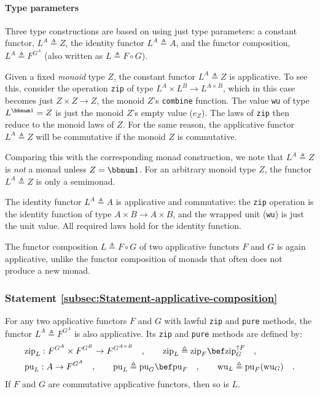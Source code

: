 \paragraph{Type parameters}

Three type constructions are based on using just type parameters:
a constant functor, $L^{A}\triangleq Z$, the identity functor $L^{A}\triangleq A$,
and the functor composition, $L^{A}\triangleq F^{G^{A}}$ (also written
as $L\triangleq F\circ G$).

Given a fixed \emph{monoid} type $Z$, the constant functor $L^{A}\triangleq Z$
is applicative. To see this, consider the operation \lstinline!zip!
of type $L^{A}\times L^{B}\rightarrow L^{A\times B}$, which in this
case becomes just $Z\times Z\rightarrow Z$, the monoid $Z$\textsf{'}s \lstinline!combine!
function. The value \lstinline!wu! of type $L^{\bbnum 1}=Z$ is just
the monoid $Z$\textsf{'}s empty value ($e_{Z}$). The laws of \lstinline!zip!
then reduce to the monoid laws of $Z$. For the same reason, the applicative
functor $L^{A}\triangleq Z$ will be commutative if the monoid $Z$
is commutative.

Comparing this with the corresponding monad construction, we note
that $L^{A}\triangleq Z$ is \emph{not} a monad unless $Z=\bbnum 1$.
For an arbitrary monoid type $Z$, the functor $L^{A}\triangleq Z$
is only a semimonad.

The identity functor $L^{A}\triangleq A$ is applicative and commutative:
the \lstinline!zip! operation is the identity function of type $A\times B\rightarrow A\times B$,
and the wrapped unit (\lstinline!wu!) is just the unit value. All
required laws hold for the identity function.

The functor composition $L\triangleq F\circ G$ of two applicative
functors $F$ and $G$ is again applicative, unlike the functor composition
of monads that often does not produce a new monad.

\subsubsection{Statement \label{subsec:Statement-applicative-composition}\ref{subsec:Statement-applicative-composition}}

For any two applicative functors $F$ and $G$ with lawful \lstinline!zip!
and \lstinline!pure! methods, the functor $L^{A}\triangleq F^{G^{A}}$
is also applicative. Its \lstinline!zip! and \lstinline!pure! methods
are defined by:
\begin{align*}
 & \text{zip}_{L}:F^{G^{A}}\times F^{G^{B}}\rightarrow F^{G^{A\times B}}\quad,\quad\quad\text{zip}_{L}\triangleq\text{zip}_{F}\bef\text{zip}_{G}^{\uparrow F}\quad,\\
 & \text{pu}_{L}:A\rightarrow F^{G^{A}}\quad,\quad\quad\text{pu}_{L}\triangleq\text{pu}_{G}\bef\text{pu}_{F}\quad,\quad\quad\text{wu}_{L}\triangleq\text{pu}_{F}(\text{wu}_{G})\quad.
\end{align*}
If $F$ and $G$ are commutative applicative functors, then so is
$L$.

